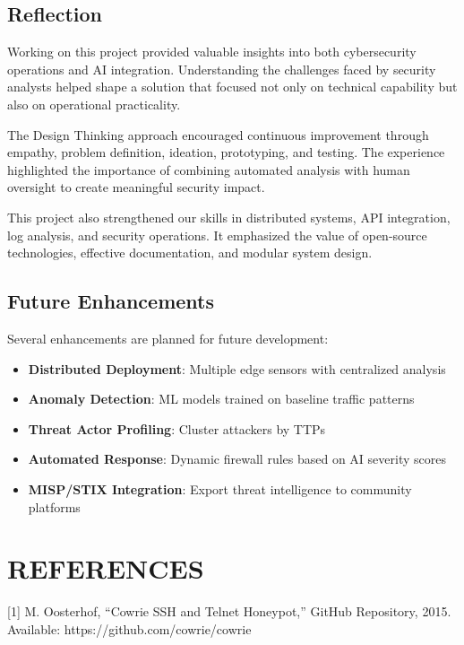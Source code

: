 \documentclass[12pt,a4paper]{report}
\begin{document}
\section{Reflection}

Working on this project provided valuable insights into both cybersecurity operations and AI integration. Understanding the challenges faced by security analysts helped shape a solution that focused not only on technical capability but also on operational practicality.

The Design Thinking approach encouraged continuous improvement through empathy, problem definition, ideation, prototyping, and testing. The experience highlighted the importance of combining automated analysis with human oversight to create meaningful security impact.

This project also strengthened our skills in distributed systems, API integration, log analysis, and security operations. It emphasized the value of open-source technologies, effective documentation, and modular system design.

\section{Future Enhancements}

Several enhancements are planned for future development:

\begin{itemize}
\item \textbf{Distributed Deployment}: Multiple edge sensors with centralized analysis
\item \textbf{Anomaly Detection}: ML models trained on baseline traffic patterns
\item \textbf{Threat Actor Profiling}: Cluster attackers by TTPs
\item \textbf{Automated Response}: Dynamic firewall rules based on AI severity scores
\item \textbf{MISP/STIX Integration}: Export threat intelligence to community platforms
\end{itemize}


\chapter*{REFERENCES}
\thispagestyle{plain}

[1] M. Oosterhof, ``Cowrie SSH and Telnet Honeypot,'' GitHub Repository, 2015. Available: https://github.com/cowrie/cowrie
\end{document}
